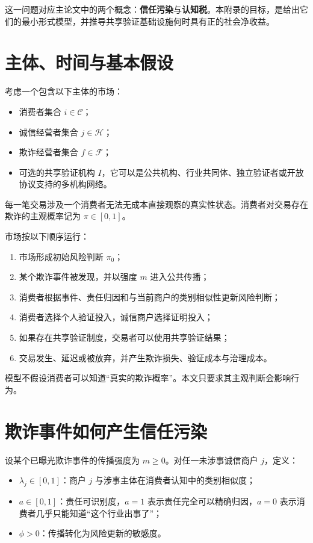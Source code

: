 \documentclass[UTF8,12pt]{ctexart}
\begin{document}
这一问题对应主论文中的两个概念：\textbf{信任污染}与\textbf{认知税}。本附录的目标，是给出它们的最小形式模型，并推导共享验证基础设施何时具有正的社会净收益。

\section{主体、时间与基本假设}

考虑一个包含以下主体的市场：

\begin{itemize}[leftmargin=2.2em]
  \item 消费者集合 $i\in\mathcal{C}$；
  \item 诚信经营者集合 $j\in\mathcal{H}$；
  \item 欺诈经营者集合 $f\in\mathcal{F}$；
  \item 可选的共享验证机构 $I$，它可以是公共机构、行业共同体、独立验证者或开放协议支持的多机构网络。
\end{itemize}

每一笔交易涉及一个消费者无法无成本直接观察的真实性状态。消费者对交易存在欺诈的主观概率记为 $\pi\in[0,1]$。

市场按以下顺序运行：

\begin{enumerate}[leftmargin=2.2em]
  \item 市场形成初始风险判断 $\pi_0$；
  \item 某个欺诈事件被发现，并以强度 $m$ 进入公共传播；
  \item 消费者根据事件、责任归因和与当前商户的类别相似性更新风险判断；
  \item 消费者选择个人验证投入，诚信商户选择证明投入；
  \item 如果存在共享验证制度，交易者可以使用共享验证结果；
  \item 交易发生、延迟或被放弃，并产生欺诈损失、验证成本与治理成本。
\end{enumerate}

模型不假设消费者可以知道“真实的欺诈概率”。本文只要求其主观判断会影响行为。

\section{欺诈事件如何产生信任污染}

设某个已曝光欺诈事件的传播强度为 $m\geq0$。对任一未涉事诚信商户 $j$，定义：

\begin{itemize}[leftmargin=2.2em]
  \item $\lambda_j\in[0,1]$：商户 $j$ 与涉事主体在消费者认知中的类别相似度；
  \item $a\in[0,1]$：责任可识别度，$a=1$ 表示责任完全可以精确归因，$a=0$ 表示消费者几乎只能知道“这个行业出事了”；
  \item $\phi>0$：传播转化为风险更新的敏感度。
\end{itemize}
\end{document}

